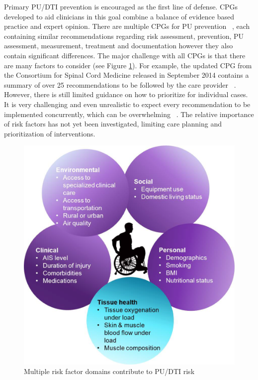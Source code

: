 \documentclass{amia}
\begin{document}
Primary PU/DTI prevention is encouraged as the first line of defense. CPGs developed to aid clinicians in this goal combine a balance of evidence based practice and expert opinion. There are multiple CPGs for PU prevention ~\cite{cpg1, cpg2, cpg3, cpg4}, each containing similar recommendations regarding risk assessment, prevention, PU assessment, measurement, treatment and documentation however they also contain significant differences. The major challenge with all CPGs is that there are many factors to consider (see Figure \ref{risk_factors}). For example, the updated CPG from the Consortium for Spinal Cord Medicine released in September 2014 contains a summary of over 25 recommendations to be followed by the care provider ~\cite{cpg5}. However, there is still limited guidance on how to prioritize for individual cases. It is very challenging and even unrealistic to expect every recommendation to be implemented concurrently, which can be overwhelming ~\cite{ref3}. The relative importance of risk factors has not yet been investigated, limiting care planning and prioritization of interventions.

\begin{figure}
  \begin{center}
    \includegraphics[scale=0.5]{pics/risk_factors.png}
  \end{center}
  \caption{Multiple risk factor domains contribute to PU/DTI risk}
  \label{risk_factors}
\end{figure}
\end{document}
